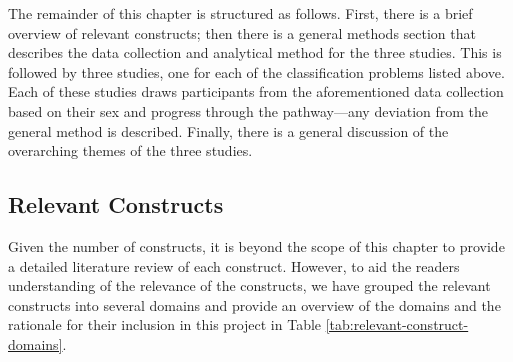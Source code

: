 \documentclass[
  12pt,
  a4paper,
]{book}
\begin{document}
The remainder of this chapter is structured as follows. First, there is a brief overview of relevant constructs; then there is a general methods section that describes the data collection and analytical method for the three studies. This is followed by three studies, one for each of the classification problems listed above. Each of these studies draws participants from the aforementioned data collection based on their sex and progress through the pathway---any deviation from the general method is described. Finally, there is a general discussion of the overarching themes of the three studies.

\hypertarget{pra-relevant-constructs}{%
\subsection{Relevant Constructs}\label{pra-relevant-constructs}}

Given the number of constructs, it is beyond the scope of this chapter to provide a detailed literature review of each construct. However, to aid the readers understanding of the relevance of the constructs, we have grouped the relevant constructs into several domains and provide an overview of the domains and the rationale for their inclusion in this project in Table \ref{tab:relevant-construct-domains}.
\end{document}
